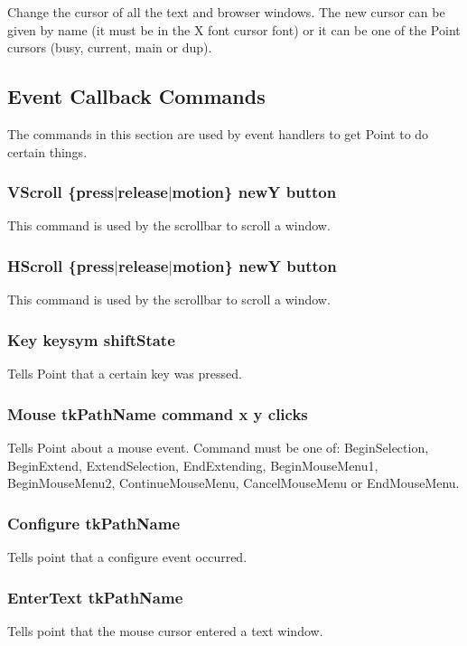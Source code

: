 Change the cursor of all the text and browser windows.
The new cursor can be given by name (it must be in the X font cursor
font) or it can be one of the Point cursors (busy, current, main or dup).





\subsection{ Event Callback Commands }

The commands in this section are used by event handlers to get
Point to do certain things.

\subsubsection{VScroll \{press$\mid$release$\mid$motion\} newY button}
This command is used by the scrollbar to scroll a window.

\subsubsection{HScroll \{press$\mid$release$\mid$motion\} newY button}
This command is used by the scrollbar to scroll a window.

\subsubsection{Key keysym shiftState}
Tells Point that a certain key was pressed.

\subsubsection{Mouse tkPathName command x y clicks}
Tells Point about a mouse event.
Command must be one of: BeginSelection, BeginExtend, ExtendSelection,
EndExtending, BeginMouseMenu1, BeginMouseMenu2, ContinueMouseMenu,
CancelMouseMenu or EndMouseMenu.

\subsubsection{Configure tkPathName}
Tells point that a configure event occurred.

\subsubsection{EnterText tkPathName}
Tells point that the mouse cursor entered a text window.

